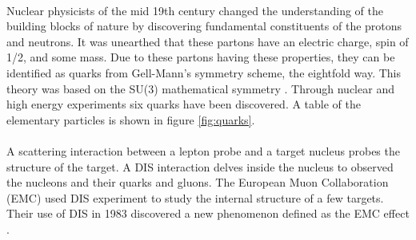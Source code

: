 \paragraph{}Nuclear physicists of the mid 19th century changed the understanding of the building blocks of nature by discovering fundamental constituents of the protons and neutrons. It was unearthed that these partons have an electric charge, spin of 1/2, and some mass. Due to these partons having these properties, they can be identified as quarks from Gell-Mann's symmetry scheme, the eightfold way. This theory was based on the SU(3) mathematical symmetry \cite{strger,8fold}.
Through nuclear and high energy experiments six quarks have been discovered\cite{DISLaH}. A table of the elementary particles is shown in figure \ref{fig:quarks}.
\paragraph{}A scattering interaction between a lepton probe and a target nucleus probes the structure of the target. A DIS interaction delves inside the nucleus to observed the nucleons and their quarks and gluons. The European Muon Collaboration (EMC) used DIS experiment to study the internal structure of a few targets. Their use of DIS in 1983 discovered a new phenomenon defined as the EMC effect \cite{PnN,CC}.

